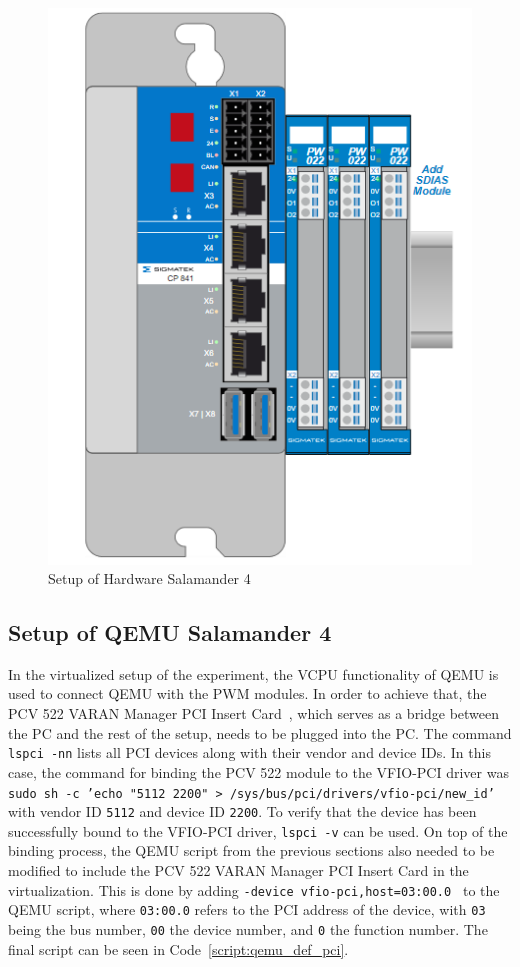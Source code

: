 \documentclass[MMR,Master,english]{twbook}
\begin{document}
\begin{figure}[H]
	\centering
	\includegraphics[width=0.45\columnwidth]{img/experiment/hardware_tree.png}
	\caption[Setup of Hardware Salamander 4]{Setup of Hardware Salamander 4}
	\label{fig:hardware_tree}
\end{figure}

\subsection{Setup of QEMU Salamander 4}\label{subsec:setup_experiment_virtualized}
In the virtualized setup of the experiment, the VCPU functionality of QEMU is used to connect QEMU with the PWM modules. In order to achieve that, the PCV 522 VARAN Manager PCI Insert Card~\cite{ControlsHMIsSIGMATEK}, which serves as a bridge between the PC and the rest of the setup, needs to be plugged into the PC. The command \texttt{lspci -nn} lists all PCI devices along with their vendor and device IDs. In this case, the command for binding the PCV 522 module to the VFIO-PCI driver was \texttt{sudo sh -c 'echo "5112 2200" > /sys/bus/pci/drivers/vfio-pci/new\_id'} with vendor ID \texttt{5112} and device ID \texttt{2200}.  To verify that the device has been successfully bound to the VFIO-PCI driver, \texttt{lspci -v} can be used. On top of the binding process, the QEMU script from the previous sections also needed to be modified to include the PCV 522 VARAN Manager PCI Insert Card in the virtualization. This is done by adding \texttt{-device\ vfio-pci,host=03:00.0 } to the QEMU script, where \texttt{03:00.0} refers to the PCI address of the device, with \texttt{03} being the bus number, \texttt{00} the device number, and \texttt{0} the function number. The final script can be seen in Code~\ref{script:qemu_def_pci}.
\end{document}
